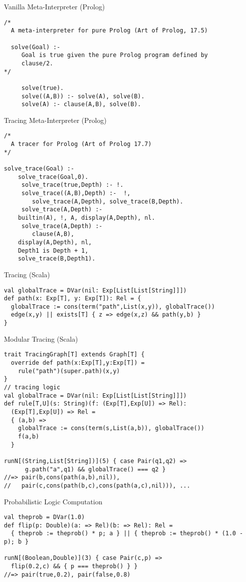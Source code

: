 \documentclass{beamer}
\begin{document}
\begin{frame}[fragile]{Vanilla Meta-Interpreter (Prolog)}
\begin{verbatim}
/*
  A meta-interpreter for pure Prolog (Art of Prolog, 17.5)

  solve(Goal) :-
     Goal is true given the pure Prolog program defined by
     clause/2.
*/

     solve(true).
     solve((A,B)) :- solve(A), solve(B).
     solve(A) :- clause(A,B), solve(B).
\end{verbatim}
\end{frame}

\begin{frame}[fragile]{Tracing Meta-Interpreter (Prolog)}
\begin{verbatim}
/*  
  A tracer for Prolog (Art of Prolog 17.7)
*/
		 
solve_trace(Goal) :-
	solve_trace(Goal,0).
     solve_trace(true,Depth) :- !.
     solve_trace((A,B),Depth) :-  !,
        solve_trace(A,Depth), solve_trace(B,Depth). 
     solve_trace(A,Depth) :-  
	builtin(A), !, A, display(A,Depth), nl.
     solve_trace(A,Depth) :-
        clause(A,B), 
	display(A,Depth), nl,
	Depth1 is Depth + 1, 
	solve_trace(B,Depth1).
\end{verbatim}
\end{frame}

\begin{frame}[fragile]{Tracing (Scala)}
\begin{verbatim}
val globalTrace = DVar(nil: Exp[List[List[String]]])
def path(x: Exp[T], y: Exp[T]): Rel = {
  globalTrace := cons(term("path",List(x,y)), globalTrace())
  edge(x,y) || exists[T] { z => edge(x,z) && path(y,b) }
}
\end{verbatim}
\end{frame}

\begin{frame}[fragile]{Modular Tracing (Scala)}
\begin{verbatim}
trait TracingGraph[T] extends Graph[T] {
  override def path(x:Exp[T],y:Exp[T]) =
    rule("path")(super.path)(x,y)
}
// tracing logic
val globalTrace = DVar(nil: Exp[List[List[String]]])
def rule[T,U](s: String)(f: (Exp[T],Exp[U]) => Rel):
  (Exp[T],Exp[U]) => Rel =
  { (a,b) =>
    globalTrace := cons(term(s,List(a,b)), globalTrace())
    f(a,b)
  }

runN[(String,List[String])](5) { case Pair(q1,q2) =>
      g.path("a",q1) && globalTrace() === q2 }
//=> pair(b,cons(path(a,b),nil)),
//   pair(c,cons(path(b,c),cons(path(a,c),nil))), ...
\end{verbatim}
\end{frame}

\begin{frame}[fragile]{Probabilistic Logic Computation}
\begin{verbatim}
val theprob = DVar(1.0)
def flip(p: Double)(a: => Rel)(b: => Rel): Rel =
  { theprob := theprob() * p; a } || { theprob := theprob() * (1.0 - p); b }

runN[(Boolean,Double)](3) { case Pair(c,p) =>
  flip(0.2,c) && { p === theprob() } }
//=> pair(true,0.2), pair(false,0.8)
\end{verbatim}
\end{frame}
\end{document}
